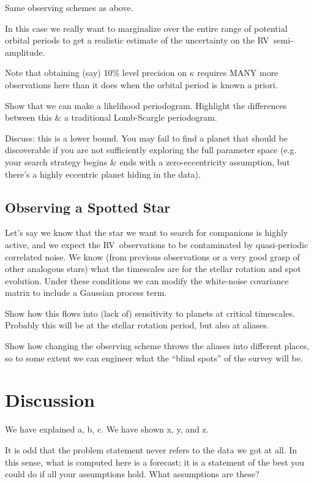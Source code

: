 \documentclass[10pt, letterpaper]{article}
\newcommand{\acronym}[1]{{\small{#1}}}
\newcommand{\rv}{\acronym{RV}}
\begin{document}
Same observing schemes as above.

In this case we really want to marginalize over the entire range of 
potential orbital periods to get a realistic estimate of the uncertainty 
on the \rv\ semi-amplitude. 

Note that obtaining (say) 10\% level precision on $\kappa$ requires MANY more 
observations here than it does when the orbital period is known a priori.

Show that we can make a likelihood periodogram. Highlight the differences between
this \& a traditional Lomb-Scargle periodogram.

Discuss: this is a lower bound. You may fail to find a planet that should be 
discoverable if you are not sufficiently exploring the full parameter space 
(e.g. your search strategy begins \& ends with a zero-eccentricity assumption, 
but there's a highly eccentric planet hiding in the data).

\subsection{Observing a Spotted Star}

Let's say we know that the star we want to search for companions is highly 
active, and we expect the \rv\ observations to be contaminated by 
quasi-periodic correlated noise. We know (from previous observations or 
a very good grasp of other analogous stars) what the timescales are for 
the stellar rotation and spot evolution. Under these conditions we can modify 
the white-noise covariance matrix to include a Gaussian process term.

Show how this flows into (lack of) sensitivity to planets at critical timescales. 
Probably this will be at the stellar rotation period, but also at aliases.

Show how changing the observing scheme throws the aliases into different places, 
so to some extent we can engineer what the ``blind spots'' of the survey will be.


\section{Discussion}\label{sec:discussion}

We have explained a, b, c. We have shown x, y, and z.

It is odd that the problem statement never refers to the data we got at all.
In this sense, what is computed here is a forecast; it is a statement of the
best you could do if all your assumptions hold. What assumptions are these?
\end{document}
